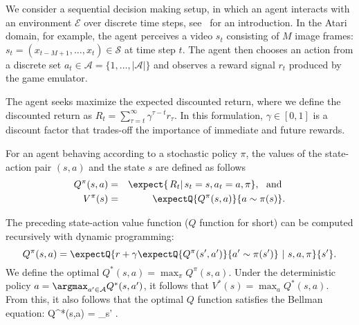 

We consider a sequential decision making setup, in which 
an agent interacts with an environment $\mathcal{E}$ over discrete time steps, see~\citet{SuttonBarto:1998} for an introduction. In the Atari domain, for example, the agent perceives a video $s_t$ consisting of $M$ image frames:  $s_t =(x_{t-M+1}, \ldots, x_t) \in \mathcal{S}$ at time step $t$. The agent then chooses an action from a discrete set $a_t \in \mathcal{A} = \{1,\ldots,|\mathcal{A}|\} $ and observes a reward signal $r_t$ produced by the game emulator. 

The agent seeks maximize the expected discounted return, where we define the discounted return as $R_t = \sum_{\tau=t}^{\infty} \gamma^{\tau-t} r_{\tau}$. In this formulation,
$\gamma \in [0,1]$ is a discount factor that trades-off the importance of immediate and future rewards.  

For an agent behaving according to a stochastic policy $\pi$, the values of the state-action pair $(s,a)$ and the state $s$ 
are defined as follows
\begin{eqnarray}
Q^{\pi}(s,a) &=& \expect{\left. R_t \right| s_t = s, a_t = a, \pi},~\mbox{ and } \nonumber \\
V^{\pi}(s) &=& \expectQ{Q^{\pi}(s,a)}{a \sim \pi(s)}.
\end{eqnarray}

The preceding state-action value function ($Q$ function for short) can be computed recursively with dynamic programming:
\[
Q^{\pi}(s,a)  = \expectQ{r + \gamma \expectQ{Q^{\pi}(s',a')}{a'\sim\pi(s')}~|~s,a,\pi}{s'}.
\]
We define the optimal $Q^{*}(s,a) = \max_{\pi} Q^{\pi}(s,a).$
Under the deterministic policy $a = \argmax_{a' \in \mathcal{A}} Q^{*}(s,a')$, it follows that
$V^{*}(s) = \max_{a} Q^{*}(s,a).$ From this, it also follows that the optimal $Q$ function satisfies the Bellman equation:
\be
Q^{*}(s,a) = \E_{s'} . 
\ee


